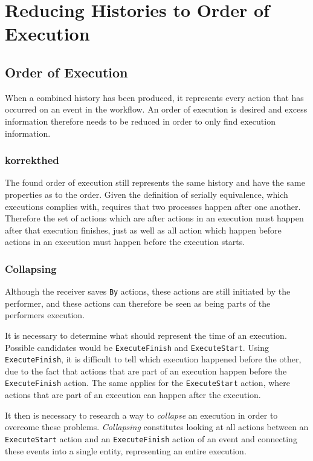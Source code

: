 \chapter{Reducing Histories to Order of Execution}
\label{chap:order-of-execution}
\section{Order of Execution}
	When a combined history has been produced, it represents every action that has occurred on an event in the workflow. 
	An order of execution is desired and excess information therefore needs to be reduced in order to only find execution information. 
	
	\subsection{korrekthed}
	The found order of execution still represents the same history and have the same properties as to the order. Given the definition of serially equivalence, which executions complies with, requires that two processes happen after one another. Therefore the set of actions which are after actions in an execution must happen after that execution finishes, just as well as all action which happen before actions in an execution must happen before the execution starts. 

	\subsection{Collapsing}
	Although the receiver saves \texttt{By} actions, these actions are still initiated by the performer, and these actions can therefore be seen as being parts of the performers execution. 
		
	It is necessary to determine what should represent the time of an execution. Possible candidates would be \texttt{ExecuteFinish} and \texttt{ExecuteStart}. Using \texttt{ExecuteFinish}, it is difficult to tell which execution happened before the other, due to the fact that actions that are part of an execution happen before the \texttt{ExecuteFinish} action. 
	The same applies for the \texttt{ExecuteStart} action, where actions that are part of an execution can happen after the execution.
	
	\newpar It then is necessary to research a way to \textit{collapse} an execution in order to overcome these problems. \textit{Collapsing} constitutes looking at all actions between an \texttt{ExecuteStart} action and an \texttt{ExecuteFinish} action of an event and connecting these events into a single entity, representing an entire execution. 
	
